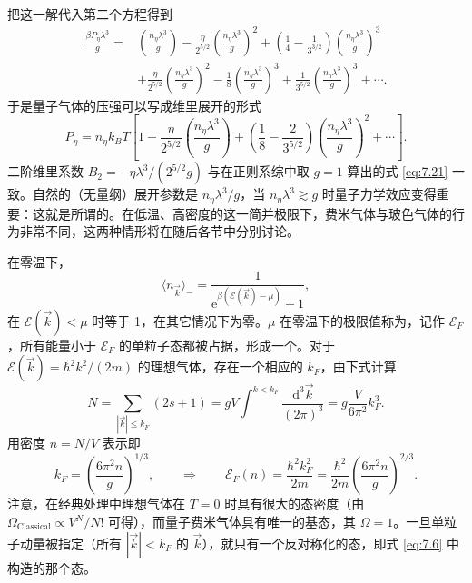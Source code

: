 把这一解代入第二个方程得到
\begin{equation*}
\begin{aligned}
\frac{\beta P_\eta\lambda^3}g=&\left(\frac{n_\eta\lambda^3}g\right)-\frac\eta{2^{5/2}}\left(\frac{n_\eta\lambda^3}g\right)^2+\left(\frac14-\frac1{3^{3/2}}\right)\left(\frac{n_\eta\lambda^3}g\right)^3\\
&+\frac\eta{2^{5/2}}\left(\frac{n_\eta\lambda^3}g\right)^2-\frac18\left(\frac{n_\eta\lambda^3}g\right)^3+\frac1{3^{5/2}}\left(\frac{n_\eta\lambda^3}g\right)^3+\cdots.
\end{aligned}
\end{equation*}
于是量子气体的压强可以写成维里展开的形式
\begin{equation}\label{eq:7.38}
P_\eta=n_\eta k_BT\left[1-\frac\eta{2^{5/2}}\left(\frac{n_\eta\lambda^3}g\right)+\left(\frac18-\frac2{3^{5/2}}\right)\left(\frac{n_\eta\lambda^3}g\right)^2+\cdots\right].
\end{equation}
二阶维里系数 $B_2=-\eta\lambda^3/(2^{5/2}g)$ 与在正则系综中取 $g=1$ 算出的式 \eqref{eq:7.21} 一致。自然的（无量纲）展开参数是 $n_\eta\lambda^3/g$，当 $n_\eta\lambda^3\gtrsim g$ 时量子力学效应变得重要：这就是所谓的。在低温、高密度的这一简并极限下，费米气体与玻色气体的行为非常不同，这两种情形将在随后各节中分别讨论。


在零温下，
\begin{equation}\label{eq:7.39}
\langle n_{\vec k}\rangle_-=\frac1{\mathrm e^{\beta(\mathcal E(\vec k)-\mu)}+1},
\end{equation}
在 $\mathcal E(\vec k)<\mu$ 时等于 1，在其它情况下为零。$\mu$ 在零温下的极限值称为，记作 $\mathcal E_F$，所有能量小于 $\mathcal E_F$ 的单粒子态都被占据，形成一个。对于 $\mathcal E(\vec k)=\hbar^2k^2/(2m)$ 的理想气体，存在一个相应的 $k_F$，由下式计算
\begin{equation}\label{eq:7.40}
N=\sum_{|\vec k|\le k_F}(2s+1)=gV\int^{k<k_F}\frac{\mathrm d^3\vec k}{(2\pi)^3}=g\frac V{6\pi^2}k_F^3.
\end{equation}
用密度 $n=N/V$ 表示即
\begin{equation}\label{eq:7.41}
k_F=\left(\frac{6\pi^2n}g\right)^{1/3},\qquad\Longrightarrow\qquad\mathcal E_F(n)=\frac{\hbar^2k_F^2}{2m}=\frac{\hbar^2}{2m}\left(\frac{6\pi^2n}g\right)^{2/3}.
\end{equation}
注意，在经典处理中理想气体在 $T=0$ 时具有很大的态密度（由 $\Omega_{\text{Classical}}\propto V^N/N!$ 可得），而量子费米气体具有唯一的基态，其 $\Omega=1$。一旦单粒子动量被指定（所有 $|\vec k|<k_F$ 的 $\vec k$），就只有一个反对称化的态，即式 \eqref{eq:7.6} 中构造的那个态。

